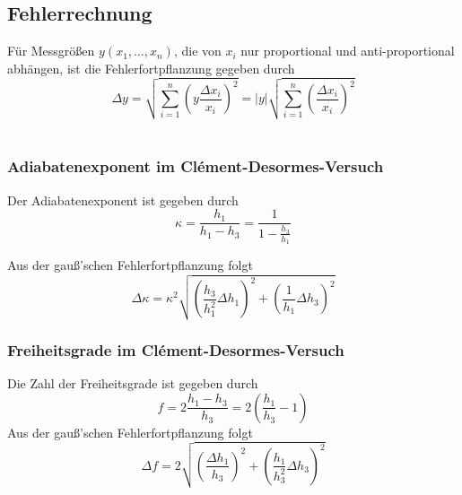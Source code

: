\label{anhang}

\subsection{Fehlerrechnung}
Für Messgrößen $ y(x_1, \dots, x_n) $, die von $ x_i $ nur proportional und anti-proportional abhängen, ist die Fehlerfortpflanzung gegeben durch
\begin{equation}
	\Delta y = \sqrt{\sum_{i=1}^{n}\left(y\frac{\Delta x_i}{x_i}\right)^2} 
		= |y|\sqrt{\sum_{i=1}^{n}\left(\frac{\Delta x_i}{x_i}\right)^2}  \label{eq:err_lin}
\end{equation}\\

\subsubsection{Adiabatenexponent im Clément-Desormes-Versuch}
Der Adiabatenexponent ist gegeben durch
\begin{equation*}
\kappa = \frac{h_1}{h_1 - h_3} = \frac{1}{1 - \frac{h_3}{h_1}}
\end{equation*}

Aus der gauß'schen Fehlerfortpflanzung folgt
\begin{equation}
	\Delta \kappa = \kappa^2\sqrt{\left(\frac{h_3}{h_1^2}\Delta h_1\right)^2 + \left(\frac{1}{h_1}\Delta h_3\right)^2} \label{eq:err_k2}
\end{equation}
\subsubsection{Freiheitsgrade im Clément-Desormes-Versuch}
Die Zahl der Freiheitsgrade ist gegeben durch
\begin{equation*}
	f = 2\frac{h_1 - h_3}{h_3} = 2\left(\frac{h_1}{h_3} - 1\right)
\end{equation*}
Aus der gauß'schen Fehlerfortpflanzung folgt
\begin{equation}
	\Delta f = 2\sqrt{\left(\frac{\Delta h_1}{h_3}\right)^2 + \left(\frac{h_1}{h_3^2}\Delta h_3\right)^2} \label{eq:err_f}
\end{equation}

